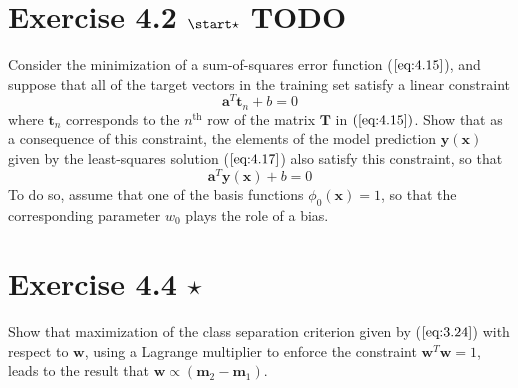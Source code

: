 \section*{Exercise 4.2 $\start \star$ \textbf{TODO}} 
Consider the minimization of a sum-of-squares error
function ($\ref{eq:4.15}$), and suppose that all of the 
target vectors in the training set satisfy a linear constraint
\begin{equation}\label{eq:4.157}\tag{4.157}
    \mathbf{a}^T\mathbf{t}_n + b = 0
\end{equation}
where $\mathbf{t}_n$ corresponds to the $n^\text{th}$ row of the matrix $\mathbf{T}$
in $(\ref{eq:4.15})$. Show that as a consequence of this constraint,
the elements of the model prediction $\mathbf{y}(\mathbf{x})$ given
by the least-squares solution ($\ref{eq:4.17}$) also satisfy
this constraint, so that
\begin{equation}\label{eq:4.158}\tag{4.158}
    \mathbf{a}^T\mathbf{y}(\mathbf{x}) + b = 0
\end{equation}
To do so, assume that one of the basis functions $\phi_0(\mathbf{x}) = 1$,
so that the corresponding parameter $w_0$ plays the role of a bias.

\section*{Exercise 4.4 $\star$}
Show that maximization of the class separation criterion given by
($\ref{eq:3.24}$) with respect to $\mathbf{w}$, using a Lagrange multiplier
to enforce the constraint $\mathbf{w}^T\mathbf{w} = 1$, leads to the
result that $\mathbf{w} \propto (\mathbf{m}_2 - \mathbf{m}_1)$.

\vspace{1em}

